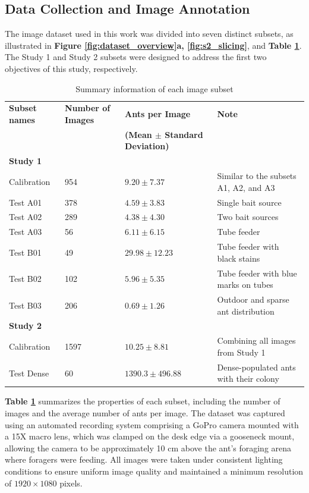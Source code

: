 \subsection{Data Collection and Image Annotation}

The image dataset used in this work was divided into seven distinct subsets, as illustrated in \textbf{Figure \ref{fig:dataset_overview}a, \ref{fig:s2_slicing}}, and \textbf{Table \ref{tab:dataset_overview}}. The Study 1 and Study 2 subsets were designed to address the first two objectives of this study, respectively.

\begin{table}[H]
    \centering
    \caption{Summary information of each image subset}
    \label{tab:dataset_overview}
    \small %
    \begin{tabular}{llll}
        \toprule
        \textbf{Subset names} & \textbf{Number of Images} & \textbf{Ants per Image} & \textbf{Note} \\
        & & \textbf{(Mean $\pm$ Standard Deviation)} & \\
        \midrule
        \textbf{Study 1} & & & \\
        \midrule
        Calibration & 954 & $9.20 \pm 7.37$ & Similar to the subsets A1, A2, and A3 \\
        Test A01 & 378 & $4.59 \pm 3.83$ & Single bait source \\
        Test A02 & 289 & $4.38 \pm 4.30$ & Two bait sources \\
        Test A03 & 56 & $6.11 \pm 6.15$ & Tube feeder \\
        Test B01 & 49 & $29.98 \pm 12.23$ & Tube feeder with black stains \\
        Test B02 & 102 & $5.96 \pm 5.35$ & Tube feeder with blue marks on tubes\\
        Test B03 & 206 & $0.69 \pm 1.26$ & Outdoor and sparse ant distribution \\
        \midrule
        \textbf{Study 2} & & & \\
        \midrule
        Calibration & 1597 & $10.25 \pm 8.81$ & Combining all images from Study 1\\
        Test Dense & 60 & $1390.3 \pm 496.88$ & Dense-populated ants with their colony\\
        \bottomrule
    \end{tabular}
\end{table}

\textbf{Table \ref{tab:dataset_overview}} summarizes the properties of each subset, including the number of images and the average number of ants per image. The dataset was captured using an automated recording system comprising a GoPro camera mounted with a 15X macro lens, which was clamped on the desk edge via a gooseneck mount, allowing the camera to be approximately 10 cm above the ant's foraging arena where foragers were feeding. All images were taken under consistent lighting conditions to ensure uniform image quality and maintained a minimum resolution of $1920 \times 1080$ pixels.

